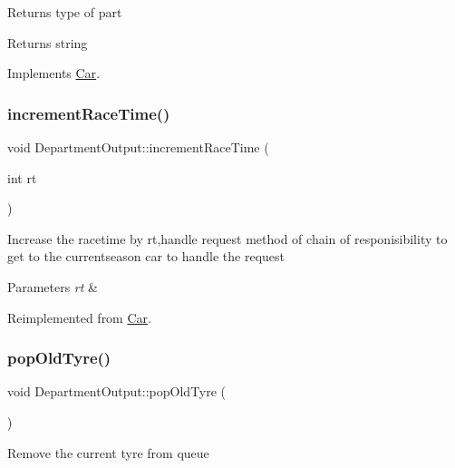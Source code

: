 Returns type of part \begin{DoxyReturn}{Returns}
string 
\end{DoxyReturn}


Implements \hyperlink{classCar_ae502eb1c04753317ebdb759497fd030c}{Car}.

\mbox{\label{classDepartmentOutput_a64f6b8afd2702b4d223c4cac0909b470}} 
\subsubsection{\texorpdfstring{increment\+Race\+Time()}{incrementRaceTime()}}
{\footnotesize\ttfamily void Department\+Output\+::increment\+Race\+Time (\begin{DoxyParamCaption}\item[{int}]{rt }\end{DoxyParamCaption})\hspace{0.3cm}{\ttfamily [virtual]}}

Increase the racetime by rt,handle request method of chain of responisibility to get to the currentseason car to handle the request 
\begin{DoxyParams}{Parameters}
{\em rt} & \\
\hline
\end{DoxyParams}


Reimplemented from \hyperlink{classCar_a3944276e317e680a756ac58e7bac6e6f}{Car}.

\mbox{\label{classDepartmentOutput_a9c1846e268ea5e85eb623d8011f204f5}} 
\subsubsection{\texorpdfstring{pop\+Old\+Tyre()}{popOldTyre()}}
{\footnotesize\ttfamily void Department\+Output\+::pop\+Old\+Tyre (\begin{DoxyParamCaption}{ }\end{DoxyParamCaption})\hspace{0.3cm}{\ttfamily [virtual]}}

Remove the current tyre from queue 

